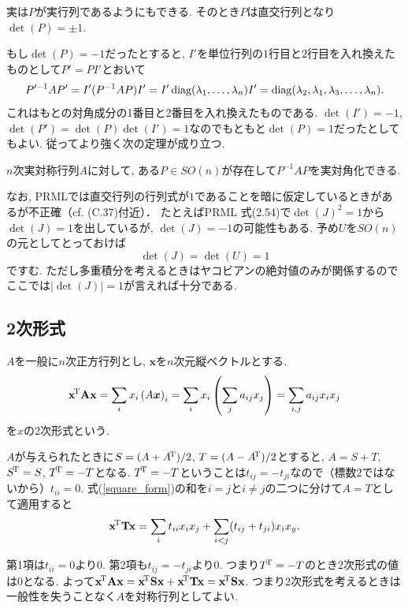 実は$P$が実行列であるようにもできる. そのとき$P$は直交行列となり$\det(P)=\pm 1$.

もし$\det(P)=-1$だったとすると, $I'$を単位行列の$1$行目と$2$行目を入れ換えたものとして$P'=PI'$とおいて
$$P'^{-1}AP'=I'(P^{-1}AP)I'=I'\mathop{\mathrm{diag}}\nolimits(\lambda_1, \ldots, \lambda_n)I'
=\mathop{\mathrm{diag}}\nolimits(\lambda_2, \lambda_1, \lambda_3, \dots, \lambda_n).$$
これはもとの対角成分の1番目と2番目を入れ換えたものである.
$\det(I')=-1$, $\det(P')=\det(P)\det(I')=1$なのでもともと$\det(P)=1$だったとしてもよい.
従ってより強く次の定理が成り立つ.
\begin{thm}\label{sym}
$n$次実対称行列$A$に対して, ある$P \in SO(n)$が存在して$P^{-1}AP$を実対角化できる.
\end{thm}
なお, PRMLでは直交行列の行列式が$1$であることを暗に仮定しているときがあるが不正確（cf. (C.37)付近）．
たとえばPRML 式(2.54)で$\det(J)^2=1$から$\det(J)=1$を出しているが, $\det(J)=-1$の可能性もある.
予め$U$を$SO(n)$の元としてとっておけば
$$
\det(J)=\det(U)=1
$$
\pagebreak
ですむ.
ただし多重積分を考えるときはヤコビアンの絶対値のみが関係するのでここでは$|\det(J)|=1$が言えれば十分である.

\subsection{2次形式}

$A$を一般に$n$次正方行列とし, $\bm{x}$を$n$次元縦ベクトルとする.
\begin{equation}\label{square_form}
{\mathbf{\boldsymbol{x}}}^{\!\mathrm{T}} \mathbf{\boldsymbol{A}} \mathbf{\boldsymbol{x}} = \sum_i x_i \left(A \bm{x}\right)_i = \sum_i x_i \left(\sum_j a_{ij} x_j\right) = \sum_{i,j} a_{ij} x_i x_j
\end{equation}
を$x$の2次形式という.

$A$が与えられたときに$S=(A+{A}^{\!\mathrm{T}})/2$, $T=(A-{A}^{\!\mathrm{T}})/2$とすると,
$A=S+T$, ${S}^{\!\mathrm{T}}=S$, ${T}^{\!\mathrm{T}}=-T$となる.
${T}^{\!\mathrm{T}}=-T$ということは$t_{ij}=-t_{ji}$なので（標数$2$ではないから）$t_{ii}=0$.
式(\ref{square_form})の和を$i=j$と$i\neq j$の二つに分けて$A=T$として適用すると
$${\mathbf{\boldsymbol{x}}}^{\!\mathrm{T}} \mathbf{\boldsymbol{T}} \mathbf{\boldsymbol{x}} = \sum_i t_{ii} x_i x_j + \sum_{i<j} (t_{ij} + t_{ji}) x_i x_y.$$

第1項は$t_{ii}=0$より$0$. 第2項も$t_{ij}=-t_{ji}$より$0$.
つまり${T}^{\!\mathrm{T}}=-T$のとき2次形式の値は$0$となる.
よって${\mathbf{\boldsymbol{x}}}^{\!\mathrm{T}} \mathbf{\boldsymbol{A}} \mathbf{\boldsymbol{x}} = {\mathbf{\boldsymbol{x}}}^{\!\mathrm{T}} \mathbf{\boldsymbol{S}} \mathbf{\boldsymbol{x}} + {\mathbf{\boldsymbol{x}}}^{\!\mathrm{T}} \mathbf{\boldsymbol{T}} \mathbf{\boldsymbol{x}} = {\mathbf{\boldsymbol{x}}}^{\!\mathrm{T}} \mathbf{\boldsymbol{S}} \mathbf{\boldsymbol{x}}$.
つまり2次形式を考えるときは一般性を失うことなく$A$を対称行列としてよい.

